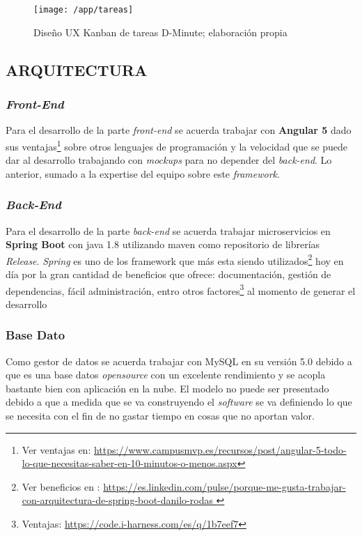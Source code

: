 \begin{figure}[!h]
\centering
\texttt{[image: /app/tareas]}
\caption{Diseño UX Kanban de tareas D-Minute; elaboración propia} 
\label{img4-13}
\end{figure}

\subsection{ARQUITECTURA}

\subsubsection{\textit{Front-End}}

Para el desarrollo de la parte \textit{front-end} se acuerda trabajar con \textbf{Angular 5} dado sus ventajas\footnote{Ver ventajas en: \url{https://www.campusmvp.es/recursos/post/angular-5-todo-lo-que-necesitas-saber-en-10-minutos-o-menos.aspx}} sobre otros lenguajes de programación y la velocidad que se puede dar al desarrollo trabajando con \textit{mockups} para no depender del \textit{back-end}. Lo anterior, sumado a la expertise del equipo sobre este \textit{framework}.

\subsubsection{\textit{Back-End}}

Para el desarrollo de la parte \textit{back-end} se acuerda trabajar microservicios en \textbf{Spring Boot} con java 1.8 utilizando maven como repositorio de librerías \textit{Release}. \textit{Spring} es uno de los framework que más esta siendo utilizados\footnote{Ver beneficios en : \url{https://es.linkedin.com/pulse/porque-me-gusta-trabajar-con-arquitectura-de-spring-boot-danilo-rodas
}} hoy en día por la gran cantidad de beneficios que ofrece: documentación, gestión de dependencias, fácil administración, entro otros factores\footnote{Ventajas: \url{https://code.i-harness.com/es/q/1b7eef7}} al momento de generar el desarrollo

\subsubsection{Base Dato}

Como gestor de datos se acuerda trabajar con MySQL en su versión 5.0 debido a que es una base datos \textit{opensource} con un excelente rendimiento y se acopla bastante bien con aplicación en la nube. 
El modelo no puede ser presentado debido a que a medida que se va construyendo el \textit{software} se va definiendo lo que se necesita con el fin de no gastar tiempo en cosas que no aportan valor.

